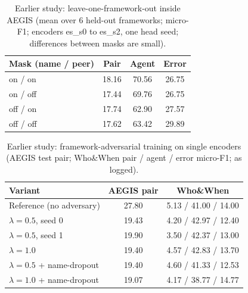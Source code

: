 \begin{table}[t]
\caption{Earlier study: leave-one-framework-out inside AEGIS (mean over 6 held-out frameworks; micro-F1; encoders es\_s0 to es\_s2, one head seed; differences between masks are small).}
\label{tab:lofo}
\centering\footnotesize\setlength{\tabcolsep}{3pt}
\begin{tabular}{@{}lccc@{}}
\toprule
Mask (name / peer) & Pair & Agent & Error \\
\midrule
on / on & 18.16 & 70.56 & 26.75 \\
on / off & 17.44 & 69.76 & 26.75 \\
off / on & 17.74 & 62.90 & 27.57 \\
off / off & 17.62 & 63.42 & 29.89 \\
\bottomrule
\end{tabular}
\end{table}

\begin{table}[t]
\caption{Earlier study: framework-adversarial training on single encoders (AEGIS test pair; Who\&When pair / agent / error micro-F1; as logged).}
\label{tab:adv}
\centering\footnotesize\setlength{\tabcolsep}{3pt}
\begin{tabular}{@{}lcc@{}}
\toprule
Variant & AEGIS pair & Who\&When \\
\midrule
Reference (no adversary) & 27.80 & 5.13 / 41.00 / 14.00 \\
$\lambda=0.5$, seed 0 & 19.43 & 4.20 / 42.97 / 12.40 \\
$\lambda=0.5$, seed 1 & 19.90 & 3.50 / 42.37 / 13.00 \\
$\lambda=1.0$ & 19.40 & 4.57 / 42.83 / 13.70 \\
$\lambda=0.5$ + name-dropout & 19.40 & 4.60 / 41.33 / 12.53 \\
$\lambda=1.0$ + name-dropout & 19.07 & 4.17 / 38.77 / 14.77 \\
\bottomrule
\end{tabular}
\end{table}

